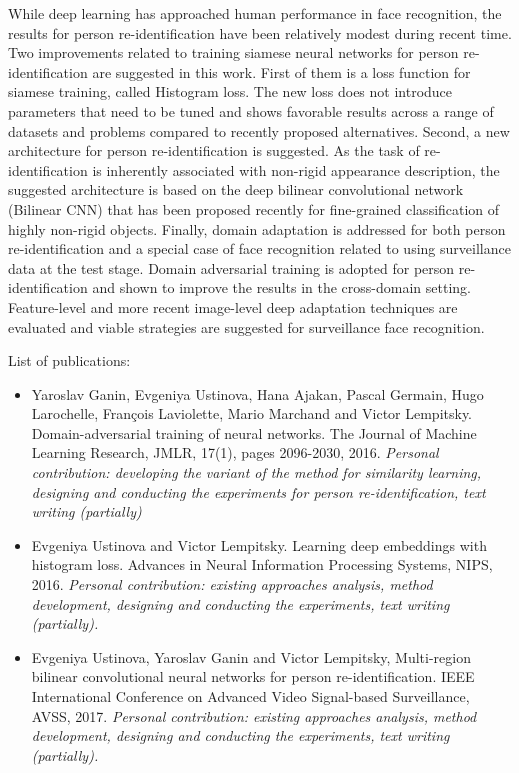 \documentclass[a4paper, 11pt, oneside]{Thesis}  %
\begin{document}
{While deep learning has approached human performance in face recognition, the results for person re-identification have been relatively modest during recent time. Two improvements related to training siamese neural networks for person re-identification are suggested in this work. First of them is a loss function for siamese training, called Histogram loss. The new loss does not introduce parameters that need to be tuned and shows favorable results across a range of datasets and problems compared to recently proposed alternatives. Second, a new architecture for person re-identification is suggested. As the task of re-identification is inherently associated with non-rigid appearance description, the suggested architecture is based on the deep bilinear convolutional network (Bilinear CNN) that has been proposed recently for fine-grained classification of highly non-rigid objects. Finally, domain adaptation is addressed for both person re-identification and a special case of face recognition related to using surveillance data at the test stage. Domain adversarial training is adopted for person re-identification and shown to improve the results in the cross-domain setting. Feature-level and more recent image-level deep adaptation techniques are evaluated and viable strategies are suggested for surveillance face recognition.



}

\clearpage  %

{\large
 List of publications:}



\begin{itemize}
    \item 
Yaroslav Ganin, Evgeniya Ustinova, Hana Ajakan, Pascal Germain, Hugo Larochelle, Fran\c{c}ois Laviolette, Mario Marchand and Victor Lempitsky. Domain-adversarial training of neural networks. The Journal of Machine Learning Research, JMLR, 17(1), pages 2096-2030, 2016.
 \textit{Personal contribution: developing the variant of the method for similarity learning, designing and conducting the experiments for person re-identification, text writing (partially)}
           
    \item
Evgeniya Ustinova and Victor Lempitsky. Learning deep embeddings with histogram loss. Advances in Neural Information Processing Systems, NIPS, 2016.
\textit{Personal contribution: existing approaches analysis, method development, designing and conducting the experiments, text writing (partially).}
       
    \item
    Evgeniya Ustinova, Yaroslav Ganin and Victor Lempitsky,  Multi-region bilinear convolutional neural networks for person re-identification. IEEE International Conference on Advanced Video Signal-based Surveillance, AVSS, 2017.
    \textit{Personal contribution: existing approaches analysis, method development, designing and conducting the experiments, text writing (partially).}
    
\end{itemize}
\end{document}
